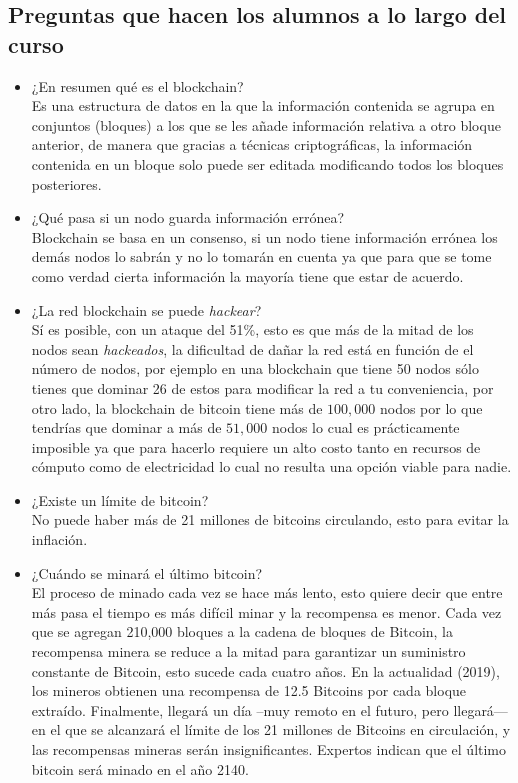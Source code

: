 \documentclass[a4paper,12pt]{/home/armando/Documentos/Cursos/LaTeX/Plantillas/lib/pub}
\begin{document}
\subsection{Preguntas que hacen los alumnos a lo largo del curso}
\begin{itemize}
	\item ¿En resumen qué es el blockchain?\\
	Es una estructura de datos en la que la información contenida se agrupa en conjuntos (bloques) a los que se les añade información relativa a otro bloque anterior, de manera que gracias a técnicas criptográficas, la información contenida en un bloque solo puede ser editada modificando todos los bloques posteriores.
	\item ¿Qué pasa si un nodo guarda información errónea?\\
	Blockchain se basa en un consenso, si un nodo tiene información errónea los demás nodos lo sabrán y no lo tomarán en cuenta ya que para que se tome como verdad cierta información la mayoría tiene que estar de acuerdo.
	\item ¿La red blockchain se puede \textit{hackear}?\\
	Sí es posible, con un ataque del 51\%, esto es que más de la mitad de los nodos sean \textit{hackeados}, la dificultad de dañar la red está en función de el número de nodos, por ejemplo en una blockchain que tiene 50 nodos sólo tienes que dominar 26 de estos para modificar la red a tu conveniencia, por otro lado, la blockchain de bitcoin tiene más de $ 100,000 $ nodos por lo que tendrías que dominar a más de $ 51,000 $ nodos lo cual es prácticamente imposible ya que para hacerlo requiere un alto costo tanto en recursos de cómputo como de electricidad lo cual no resulta una opción viable para nadie.
	\item ¿Existe un límite de bitcoin?\\
	No puede haber más de 21 millones de bitcoins circulando, esto para evitar la inflación.
	\item ¿Cuándo se minará el último bitcoin?\\
	El proceso de minado cada vez se hace más lento, esto quiere decir que entre más pasa el tiempo es más difícil minar y la recompensa es menor. Cada vez que se agregan 210,000 bloques a la cadena de bloques de Bitcoin, la recompensa minera se reduce a la mitad para garantizar un suministro constante de Bitcoin, esto sucede cada cuatro años. En la actualidad (2019), los mineros obtienen una recompensa de 12.5 Bitcoins por cada bloque extraído. Finalmente, llegará un día –muy remoto en el futuro, pero llegará— en el que se alcanzará el límite de los 21 millones de Bitcoins en circulación, y las recompensas mineras serán insignificantes. Expertos indican que el último bitcoin será minado en el año 2140.

\end{itemize}
\end{document}
